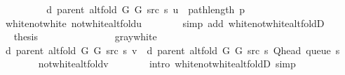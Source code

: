 \begin{isabellebody}
\ \ \ \ \isamarkupfalse%
\ \isamarkupfalse%
\ {\isachardoublequoteopen}{\isachardot}{\kern0pt}{\isachardot}{\kern0pt}{\isachardot}{\kern0pt}\ {\isacharequal}{\kern0pt}\ d\ {\isacharparenleft}{\kern0pt}parent\ {\isacharparenleft}{\kern0pt}alt{\isacharunderscore}{\kern0pt}fold\ G{}\ G{}\ src\ s{\isacharparenright}{\kern0pt}{\isacharparenright}{\kern0pt}\ u\ {\isacharplus}{\kern0pt}\ path{\isacharunderscore}{\kern0pt}length\ p{\isachardoublequoteclose}\isanewline
\ \ \ \ \ \ \isamarkupfalse%
\ white{\isacharunderscore}{\kern0pt}not{\isacharunderscore}{\kern0pt}white\ not{\isacharunderscore}{\kern0pt}white{\isacharunderscore}{\kern0pt}alt{\isacharunderscore}{\kern0pt}fold{\isacharunderscore}{\kern0pt}u\isanewline
\ \ \ \ \ \ \isamarkupfalse%
\ {\isacharparenleft}{\kern0pt}simp\ add{\isacharcolon}{\kern0pt}\ white{\isacharunderscore}{\kern0pt}not{\isacharunderscore}{\kern0pt}white{\isacharunderscore}{\kern0pt}alt{\isacharunderscore}{\kern0pt}foldD{\isacharunderscore}{\kern0pt}{}{\isacharparenright}{\kern0pt}\isanewline
\ \ \ \ \isamarkupfalse%
\ \isamarkupfalse%
\ {\isacharquery}{\kern0pt}thesis\isanewline
\ \ \ \ \ \ \isacommand{{\isachardot}{\kern0pt}}\isamarkupfalse%
\isanewline
\ \ \isamarkupfalse%
\isanewline
\ \ \ \ \isamarkupfalse%
\ gray{\isacharunderscore}{\kern0pt}white\isanewline
\ \ \ \ \isamarkupfalse%
\ {\isachardoublequoteopen}d\ {\isacharparenleft}{\kern0pt}parent\ {\isacharparenleft}{\kern0pt}alt{\isacharunderscore}{\kern0pt}fold\ G{}\ G{}\ src\ s{\isacharparenright}{\kern0pt}{\isacharparenright}{\kern0pt}\ v\ {\isacharequal}{\kern0pt}\ d\ {\isacharparenleft}{\kern0pt}parent\ {\isacharparenleft}{\kern0pt}alt{\isacharunderscore}{\kern0pt}fold\ G{}\ G{}\ src\ s{\isacharparenright}{\kern0pt}{\isacharparenright}{\kern0pt}\ {\isacharparenleft}{\kern0pt}Q{\isacharunderscore}{\kern0pt}head\ {\isacharparenleft}{\kern0pt}queue\ s{\isacharparenright}{\kern0pt}{\isacharparenright}{\kern0pt}\ {\isacharplus}{\kern0pt}\ {}{\isachardoublequoteclose}\isanewline
\ \ \ \ \ \ \isamarkupfalse%
\ not{\isacharunderscore}{\kern0pt}white{\isacharunderscore}{\kern0pt}alt{\isacharunderscore}{\kern0pt}fold{\isacharunderscore}{\kern0pt}v\isanewline
\ \ \ \ \ \ \isamarkupfalse%
\ {\isacharparenleft}{\kern0pt}intro\ white{\isacharunderscore}{\kern0pt}not{\isacharunderscore}{\kern0pt}white{\isacharunderscore}{\kern0pt}alt{\isacharunderscore}{\kern0pt}foldD{\isacharunderscore}{\kern0pt}{}{\isacharparenright}{\kern0pt}\ simp\isanewline

\end{isabellebody}
